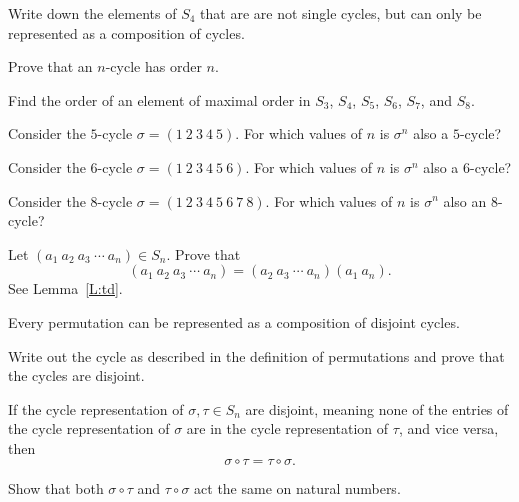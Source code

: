 \documentclass{ximera}
\begin{document}
\begin{exercise}
  Write down the elements of $S_4$ that are are not single cycles, but
  can only be represented as a composition of cycles.
\end{exercise}



\begin{exercise}
  Prove that an $n$-cycle has order $n$.
\end{exercise}


\begin{exercise}
  Find the order of an element of maximal order in $S_3$, $S_4$,
  $S_5$, $S_6$, $S_7$, and $S_8$.
\end{exercise}


\begin{exercise}
  Consider the $5$-cycle $\sigma=(1 \ 2\ 3\ 4\ 5 )$. For which values
  of $n$ is $\sigma^n$ also a $5$-cycle?
\end{exercise}


\begin{exercise}
  Consider the $6$-cycle $\sigma=(1 \ 2\ 3\ 4\ 5 \ 6)$. For which
  values of $n$ is $\sigma^n$ also a $6$-cycle?
\end{exercise}


\begin{exercise}
  Consider the $8$-cycle $\sigma=(1 \ 2\ 3\ 4\ 5 \ 6 \ 7 \ 8)$. For
  which values of $n$ is $\sigma^n$ also an $8$-cycle?
\end{exercise}





\begin{exercise}\label{E:tcd}
  Let $(a_1 \ a_2 \ a_3 \ \cdots \ a_{n})\in S_n$. Prove that
  \[
  (a_1 \ a_2 \ a_3 \ \cdots \ a_{n}) = (a_2 \ a_3 \ \cdots \ a_{n}) (a_1 \ a_{n}). 
  \]
  See Lemma~\ref{L:td}.
\end{exercise}


\begin{lemma}\label{L:CC}
  Every permutation can be represented as a composition of disjoint
  cycles.
  \begin{sketch}
    Write out the cycle as described in the definition of permutations
    and prove that the cycles are disjoint.
  \end{sketch}
\end{lemma}

\begin{lemma}
  If the cycle representation of $\sigma,\tau\in S_n$ are disjoint,
  meaning none of the entries of the cycle representation of $\sigma$
  are in the cycle representation of $\tau$, and vice versa, then
  \[
  \sigma \circ \tau = \tau \circ \sigma.
  \]
  \begin{sketch}
    Show that both $\sigma \circ \tau$ and $\tau \circ \sigma$ act the
    same on natural numbers.
  \end{sketch} 
\end{lemma}
\end{document}
